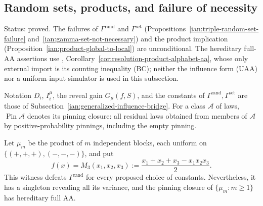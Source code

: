 \subsection{Random sets, products, and failure of necessity}
\label{ian:gamma-set-products-and-necessity}

Status: proved. The failures of \(\Gamma^{\mathrm{rand}}\) and \(\Gamma^{\mathrm{set}}\) (Propositions~\ref{ian:triple-random-set-failure} and~\ref{ian:gamma-set-not-necessary}) and the product implication (Proposition~\ref{ian:product-global-to-local}) are unconditional. The hereditary full-AA assertions use , Corollary~\ref{cor:resolution-product-alphabet-aa}, whose only external import is its counting inequality (BC); neither the influence form (UAA) nor a uniform-input simulator is used in this subsection.

Notation \(D_i\), \(I_i^\mu\), the reveal gain \(G_\mu(f,S)\), and the constants of \(\Gamma^{\mathrm{rand}},\Gamma^{\mathrm{set}}\) are those of Subsection~\ref{ian:generalized-influence-bridge}. For a class \(\mathcal A\) of laws, \(\operatorname{Pin}\mathcal A\) denotes its pinning closure: all residual laws obtained from members of \(\mathcal A\) by positive-probability pinnings, including the empty pinning.

\begin{proposition}
\label{ian:triple-random-set-failure}
Let \(\mu_m\) be the product of \(m\) independent blocks, each uniform
on \(\{(+,+,+),(-,-,-)\}\), and put
\[
 f(x)=M_3(x_1,x_2,x_3)
 :=\frac{x_1+x_2+x_3-x_1x_2x_3}{2}.
\]
This witness defeats \(\Gamma^{\mathrm{rand}}\) for every proposed
choice of constants. Nevertheless, it has a singleton revealing all
its variance, and the pinning closure of \(\{\mu_m:m\ge1\}\) has
hereditary full AA.
\end{proposition}

